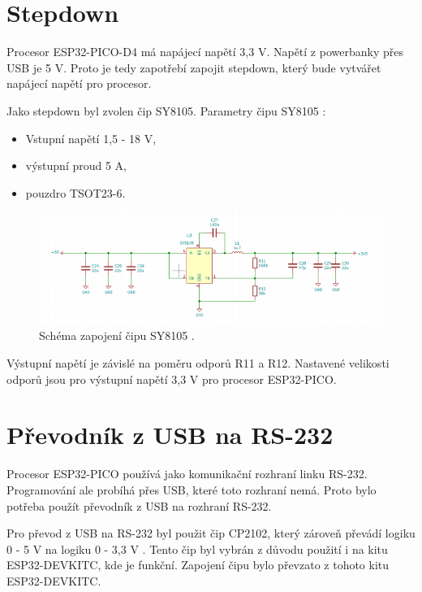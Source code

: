   \section{Stepdown}
  Procesor ESP32-PICO-D4 má napájecí napětí 3,3 V. Napětí z powerbanky přes USB je 5 V. Proto je tedy zapotřebí zapojit 
  stepdown, který bude vytvářet napájecí napětí pro procesor.

  Jako stepdown byl zvolen čip SY8105.
  Parametry čipu SY8105 \cite{SY8105_datasheet}:
  \begin{itemize}
    \item Vstupní napětí 1,5 - 18 V,
    \item výstupní proud 5 A,
    \item pouzdro TSOT23-6.
  \end{itemize}

  \begin{figure}[!h]
    \begin{center}
      \includegraphics[scale=0.5]{obrazky/SY8105_schema.png}
    \end{center}
    \caption[SY8105 schéma]{Schéma zapojení čipu SY8105 \cite{SY8105_datasheet}.}
  \end{figure}

  Výstupní napětí je závislé na poměru odporů R11 a R12. Nastavené velikosti odporů jsou pro výstupní napětí 3,3 V pro procesor 
  ESP32-PICO.

  \section{Převodník z USB na RS-232}
  Procesor ESP32-PICO používá jako komunikační rozhraní linku RS-232. Programování ale probíhá přes USB, které toto rozhraní
  nemá. Proto bylo potřeba použít převodník z USB na rozhraní RS-232.
  
  Pro převod z USB na RS-232 byl použit čip CP2102, který  zároveň převádí logiku 0 - 5 V na logiku 0 - 3,3 V 
  \cite{CP2102_datasheet}. Tento čip byl vybrán z důvodu použití i na kitu ESP32-DEVKITC, kde je funkční.
  Zapojení čipu bylo převzato z tohoto kitu ESP32-DEVKITC.

